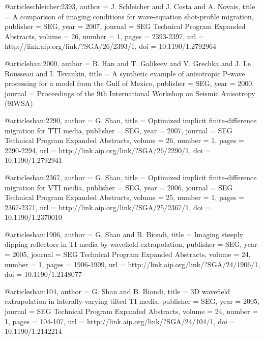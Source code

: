 @article{schleicher:2393,
  author =	 {J. Schleicher and J. Costa and
                  A. Novais},
  title =	 {A comparison of imaging conditions for wave-equation
                  shot-profile migration},
  publisher =	 {SEG},
  year =	 2007,
  journal =	 {SEG Technical Program Expanded Abstracts},
  volume =	 26,
  number =	 1,
  pages =	 {2393-2397},
  url =		 {http://link.aip.org/link/?SGA/26/2393/1},
  doi =		 {10.1190/1.2792964}
}

@article{han:2000,
  author =	 {B. Han and T. Galikeev and V. Grechka
                  and J. Le Rousseau and I. Tsvankin},
  title =	 {A synthetic example of anisotropic {P}-wave
                  processing for a model from the {G}ulf of {M}exico},
  publisher =	 {SEG},
  year =	 2000,
  journal =	 {Proceedings of the 9th International Workshop on
                  Seismic Anisotropy (9IWSA)}
}

@article{shan:2290,
  author =	 {G. Shan},
  title =	 {Optimized implicit finite-difference migration for
                  {TTI} media},
  publisher =	 {SEG},
  year =	 2007,
  journal =	 {SEG Technical Program Expanded Abstracts},
  volume =	 26,
  number =	 1,
  pages =	 {2290-2294},
  url =		 {http://link.aip.org/link/?SGA/26/2290/1},
  doi =		 {10.1190/1.2792941}
}

@article{shan:2367,
  author =	 {G. Shan},
  title =	 {Optimized implicit finite-difference migration for
                  {VTI} media},
  publisher =	 {SEG},
  year =	 2006,
  journal =	 {SEG Technical Program Expanded Abstracts},
  volume =	 25,
  number =	 1,
  pages =	 {2367-2371},
  url =		 {http://link.aip.org/link/?SGA/25/2367/1},
  doi =		 {10.1190/1.2370010}
}

@article{shan:1906,
  author =	 {G. Shan and B. Biondi},
  title =	 {Imaging steeply dipping reflectors in {TI} media by
                  wavefield extrapolation},
  publisher =	 {SEG},
  year =	 2005,
  journal =	 {SEG Technical Program Expanded Abstracts},
  volume =	 24,
  number =	 1,
  pages =	 {1906-1909},
  url =		 {http://link.aip.org/link/?SGA/24/1906/1},
  doi =		 {10.1190/1.2148077}
}

@article{shan:104,
  author =	 {G. Shan and B. Biondi},
  title =	 {{3D} wavefield extrapolation in laterally-varying
                  tilted {TI} media},
  publisher =	 {SEG},
  year =	 2005,
  journal =	 {SEG Technical Program Expanded Abstracts},
  volume =	 24,
  number =	 1,
  pages =	 {104-107},
  url =		 {http://link.aip.org/link/?SGA/24/104/1},
  doi =		 {10.1190/1.2142214}
}

